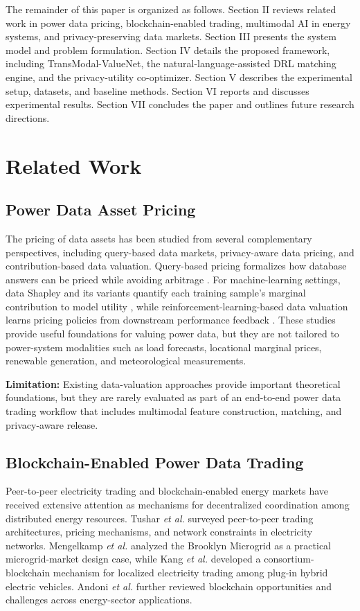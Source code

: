 \documentclass{ieeeaccess}
\begin{document}
The remainder of this paper is organized as follows. Section II reviews related work in power data pricing, blockchain-enabled trading, multimodal AI in energy systems, and privacy-preserving data markets. Section III presents the system model and problem formulation. Section IV details the proposed framework, including TransModal-ValueNet, the natural-language-assisted DRL matching engine, and the privacy-utility co-optimizer. Section V describes the experimental setup, datasets, and baseline methods. Section VI reports and discusses experimental results. Section VII concludes the paper and outlines future research directions.

\section{Related Work}
\label{sec:related}

\subsection{Power Data Asset Pricing}
The pricing of data assets has been studied from several complementary perspectives, including query-based data markets, privacy-aware data pricing, and contribution-based data valuation. Query-based pricing formalizes how database answers can be priced while avoiding arbitrage \cite{b2,b6}. For machine-learning settings, data Shapley and its variants quantify each training sample's marginal contribution to model utility \cite{b7,b8}, while reinforcement-learning-based data valuation learns pricing policies from downstream performance feedback \cite{b9}. These studies provide useful foundations for valuing power data, but they are not tailored to power-system modalities such as load forecasts, locational marginal prices, renewable generation, and meteorological measurements.

\textbf{Limitation:} Existing data-valuation approaches provide important theoretical foundations, but they are rarely evaluated as part of an end-to-end power data trading workflow that includes multimodal feature construction, matching, and privacy-aware release.

\subsection{Blockchain-Enabled Power Data Trading}
Peer-to-peer electricity trading and blockchain-enabled energy markets have received extensive attention as mechanisms for decentralized coordination among distributed energy resources. Tushar \textit{et al.} \cite{b10} surveyed peer-to-peer trading architectures, pricing mechanisms, and network constraints in electricity networks. Mengelkamp \textit{et al.} \cite{b11} analyzed the Brooklyn Microgrid as a practical microgrid-market design case, while Kang \textit{et al.} \cite{b12} developed a consortium-blockchain mechanism for localized electricity trading among plug-in hybrid electric vehicles. Andoni \textit{et al.} \cite{b13} further reviewed blockchain opportunities and challenges across energy-sector applications.
\end{document}
